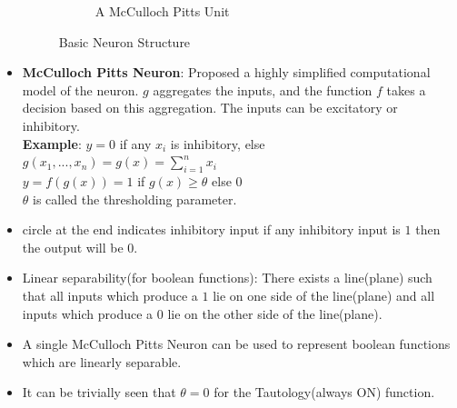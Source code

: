 \documentclass[a4paper]{article}
\begin{document}
\begin{itemize}
\begin{figure}[H]
\begin{subfigure}[b]{0.3\textwidth}
            \caption{A McCulloch Pitts Unit}
            \label{fig:DL-pitts-neuron}
        \end{subfigure}
        \caption{Basic Neuron Structure}
        \label{fig:DL-basic-neurons}
    \end{figure}
    \item \textbf{McCulloch Pitts Neuron}: Proposed a highly simplified computational model of the neuron. $g$ aggregates the inputs, and the function $f$ takes a decision based on this aggregation. The inputs can be excitatory or inhibitory.\\
    \textbf{Example}: $y=0$ if any $x_i$ is inhibitory, else $g(x_1,...,x_n)=g(x)=\sum_{i=1}^nx_i$\\
    $y=f(g(x))=1$ if $g(x)\geq \theta$ else $0$\\
    $\theta$ is called the thresholding parameter.
    \item circle at the end indicates inhibitory input if any inhibitory input is $1$ then the output will be $0$.
    \item Linear separability(for boolean functions): There exists a line(plane) such that all inputs which produce a $1$ lie on one side of the line(plane) and all inputs which produce a $0$ lie on the other side of the line(plane).
    \item A single McCulloch Pitts Neuron can be used to represent boolean functions which are linearly separable.
    \item It can be trivially seen that $\theta=0$ for the Tautology(always ON) function.
    \begin{figure}[H]
        \centering
        \begin{subfigure}[b]{0.225\textwidth}
            \centering

\end{subfigure}
\end{figure}
\end{itemize}
\end{document}
